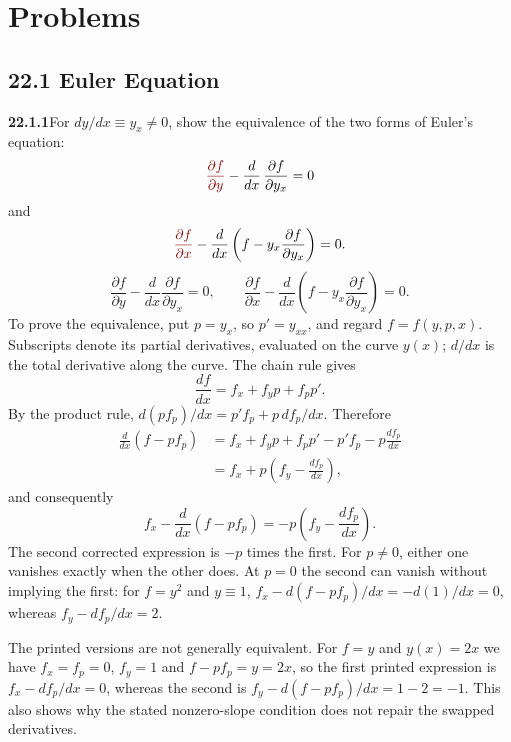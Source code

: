 
\section*{Problems}

\subsection*{22.1 Euler Equation}

\par\bigskip
\noindent\textbf{22.1.1}\quad For $dy/dx\equiv y_{x}\ne0$, show
the equivalence of the two forms of Euler's equation:
\[
\erratum{\frac{\partial f}{\partial y}}-\frac{d}{dx}\,
\frac{\partial f}{\partial y_{x}}=0
\]
and
\[
\erratum{\frac{\partial f}{\partial x}}-\frac{d}{dx}
\left(f-y_{x}\frac{\partial f}{\partial y_{x}}\right)=0.
\]
\solution
{}
\[
\boxed{\frac{\partial f}{\partial y}
-\frac{d}{dx}\frac{\partial f}{\partial y_x}=0},\qquad
\boxed{\frac{\partial f}{\partial x}
-\frac{d}{dx}\left(f-y_x\frac{\partial f}{\partial y_x}\right)=0}.
\]
To prove the equivalence, put $p=y_x$, so $p'=y_{xx}$, and regard
$f=f(y,p,x)$. Subscripts denote its partial derivatives, evaluated on
the curve $y(x)$; $d/dx$ is the total derivative along the curve.
The chain rule gives
\[
\frac{df}{dx}=f_x+f_yp+f_p p'.
\]
By the product rule, $d(pf_p)/dx=p'f_p+p\,df_p/dx$. Therefore
\[
\begin{aligned}
\frac{d}{dx}(f-pf_p)
&=f_x+f_yp+f_p p'-p'f_p-p\frac{df_p}{dx}\\
&=f_x+p\left(f_y-\frac{df_p}{dx}\right),
\end{aligned}
\]
and consequently
\[
f_x-\frac{d}{dx}(f-pf_p)
=-p\left(f_y-\frac{df_p}{dx}\right).
\]
The second corrected expression is $-p$ times the first. For $p\ne0$,
either one vanishes exactly when the other does. At $p=0$ the second
can vanish without implying the first: for $f=y^2$ and $y\equiv1$,
$f_x-d(f-pf_p)/dx=-d(1)/dx=0$, whereas $f_y-df_p/dx=2$.

The printed versions are not generally equivalent. For $f=y$ and
$y(x)=2x$ we have $f_x=f_p=0$, $f_y=1$ and $f-pf_p=y=2x$, so the first
printed expression is $f_x-df_p/dx=0$,
whereas the second is $f_y-d(f-pf_p)/dx=1-2=-1$.
This also shows why the stated nonzero-slope condition does not repair
the swapped derivatives.


